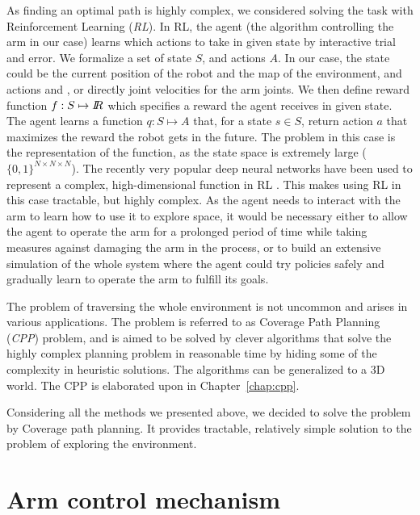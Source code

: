 \documentclass[buriama8_dp.tex]{subfiles}
\begin{document}
As finding an optimal path is highly complex, we considered solving the task with Reinforcement Learning (\emph{RL}). In RL, the agent (the algorithm controlling the arm in our case) learns which actions to take in given state by interactive trial and error. We formalize a set of state \(S\), and actions \(A\). In our case, the state could be the current position of the robot and the map of the environment, and actions  and , or directly joint velocities for the arm joints. We then define reward function \(f: S \mapsto I\!\!R\) which specifies a reward the agent receives in given state. The agent learns a function \(q: S \mapsto A\) that, for a state \(s \in S\), return action \(a\) that maximizes the reward the robot gets in the future. The problem in this case is the representation of the function, as the state space is extremely large (\(\{0,1\}^{N \times N \times N}\)). The recently very popular deep neural networks have been used to represent a complex, high-dimensional function in RL \cite{deeprl}. This makes using RL in this case tractable, but highly complex. As the agent needs to interact with the arm to learn how to use it to explore space, it would be necessary either to allow the agent to operate the arm for a prolonged period of time while taking measures against damaging the arm in the process, or to build an extensive simulation of the whole system where the agent could try policies safely and gradually learn to operate the arm to fulfill its goals.

The problem of traversing the whole environment is not uncommon and arises in various applications. The problem is referred to as Coverage Path Planning (\emph{CPP}) problem, and is aimed to be solved by clever algorithms that solve the highly complex planning problem in reasonable time by hiding some of the complexity in heuristic solutions. The algorithms can be generalized to a 3D world. The CPP is elaborated upon in Chapter~\ref{chap:cpp}.

Considering all the methods we presented above, we decided to solve the problem by Coverage path planning. It provides tractable, relatively simple solution to the problem of exploring the environment.

\section{Arm control mechanism}
\label{sec:label}

\end{document}
